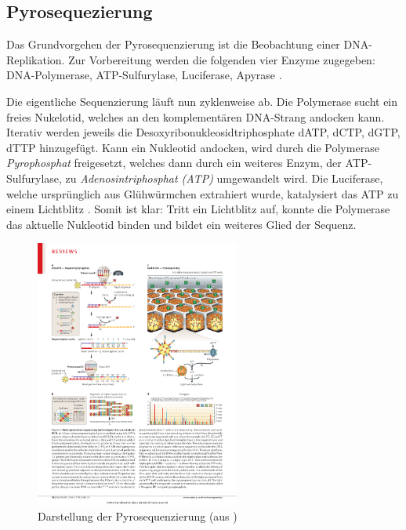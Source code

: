 \subsection{Pyrosequezierung}
\label{sec:bio:seq:pyro}

Das Grundvorgehen der Pyrosequenzierung ist die Beobachtung einer DNA-Replikation. Zur Vorbereitung werden die folgenden vier Enzyme zugegeben: DNA-Polymerase, ATP-Sulfurylase, Luciferase, Apyrase \citep{Ahmadian2006}.

Die eigentliche Sequenzierung läuft nun zyklenweise ab. Die Polymerase sucht ein freies Nukelotid, welches an den komplementären DNA-Strang andocken kann. Iterativ werden jeweils die Desoxyribonukleosidtriphosphate dATP, dCTP, dGTP, dTTP hinzugefügt. Kann ein Nukleotid andocken, wird durch die Polymerase \textit{Pyrophosphat} freigesetzt, welches dann durch ein weiteres Enzym, der ATP-Sulfurylase, zu \textit{Adenosintriphosphat (ATP)} umgewandelt wird. Die Luciferase, welche ursprünglich aus Glühwürmchen extrahiert wurde, katalysiert das ATP zu einem Lichtblitz \citep{Ahmadian2006}. Somit ist klar: Tritt ein Lichtblitz auf, konnte die Polymerase das aktuelle Nukleotid binden und bildet ein weiteres Glied der Sequenz. 
\begin{figure}[H]
	\begin{center}
		\includegraphics[width=0.6\textwidth]{bilder/Sequenzierung_Pyro_Schema}
	\end{center}
	\caption{Darstellung der Pyrosequenzierung (aus \citet{Metzker2010})}
	\label{fig:bio:seq:pyro:schema}
\end{figure}
